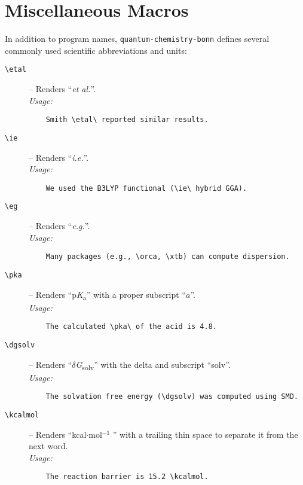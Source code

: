 \documentclass[a4paper,12pt]{article}
\begin{document}
\section{Miscellaneous Macros}
\label{sec:misc}
In addition to program names, \texttt{quantum-chemistry-bonn} defines several commonly used scientific abbreviations and units:

\begin{description}
    \item[\texttt{\textbackslash etal}]  – Renders “\textit{et al.}”. \\
    \textit{Usage:} 
    \begin{verbatim}
    Smith \etal\ reported similar results.
    \end{verbatim}

    \item[\texttt{\textbackslash ie}]    – Renders “\textit{i.e.}”. \\
    \textit{Usage:} 
    \begin{verbatim}
    We used the B3LYP functional (\ie\ hybrid GGA).
    \end{verbatim}

    \item[\texttt{\textbackslash eg}]   – Renders “\textit{e.g.}”. \\
    \textit{Usage:} 
    \begin{verbatim}
    Many packages (e.g., \orca, \xtb) can compute dispersion.
    \end{verbatim}

    \item[\texttt{\textbackslash pka}]   – Renders “p\textit{K}\textsubscript{a}” with a proper subscript “$a$”. \\
    \textit{Usage:} 
    \begin{verbatim}
    The calculated \pka\ of the acid is 4.8.
    \end{verbatim}

    \item[\texttt{\textbackslash dgsolv}] – Renders “$\delta$\textit{G}\textsubscript{solv}” with the delta and subscript “solv”. \\
    \textit{Usage:} 
    \begin{verbatim}
    The solvation free energy (\dgsolv) was computed using SMD.
    \end{verbatim}

    \item[\texttt{\textbackslash kcalmol}] – Renders “kcal$\cdot$mol$^{-1}$ ” with a trailing thin space to separate it from the next word. \\
    \textit{Usage:} 
    \begin{verbatim}
    The reaction barrier is 15.2 \kcalmol.
    \end{verbatim}
\end{description}
\end{document}
